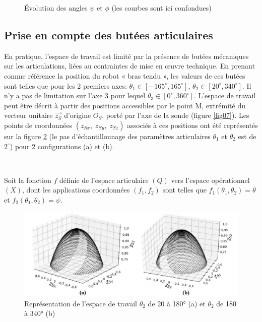 \begin{figure}[ht!]
\begin{minipage}{0.45\linewidth}
\begin{center}
\end{center}
\caption{Évolution des angles $\psi$ et $\phi$ (les courbes sont ici confondues)}
\label{fig10}
\end{minipage}
\end{figure}

\subsection{Prise en compte des butées articulaires}

En pratique, l'espace de travail est limité par la présence de butées mécaniques sur les articulations, liées au contraintes de mise en \oe uvre technique. En prenant comme référence la position du robot « bras tendu », les valeurs de ces butées sont telles que pour les 2 premiers axes: $\theta_1 \in [-165^\circ,165^\circ]$, $\theta_2 \in [20^\circ,340^\circ]$. Il n'y a pas de limitation sur l'axe 3 pour lequel $\theta_3 \in [0^\circ,360^\circ]$. L'espace de travail peut être décrit à partir des positions accessibles par le point M, extrémité du vecteur unitaire $\overrightarrow{z_S}$ d'origine $O_S$, porté par l'axe de la sonde (figure \ref{fig07}). Les points de coordonnées $(z_{Sx},\;z_{Sy},\;z_{Sz})$ associés à ces positions ont été représentés sur la figure \ref{fig11} (le pas d'échantillonnage des paramètres articulaires $\theta_1$ et $\theta_2$ est de $2^\circ$) pour 2 configurations (a) et (b).


~\

Soit la fonction $f$ définie de l'espace articulaire $(Q)$ vers l'espace opérationnel $(X)$, dont les applications coordonnées $(f_1,f_2)$ sont telles que $f_1(\theta_1,\theta_2)=\theta$ et $f_2(\theta_1,\theta_2)=\psi$.


\begin{figure}[ht!]
\begin{center}
 \includegraphics[width=0.9\linewidth]{img/fig11}
\end{center}
\caption{Représentation de l'espace de travail $\theta_2$ de 20 à 180° (a) et $\theta_2$ de 180 à 340° (b)}
\label{fig11}
\end{figure}

